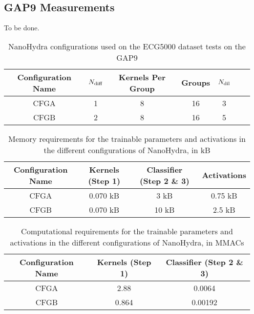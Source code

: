\subsection{GAP9 Measurements}\label{sec:rs_gap9_meas}
To be done.

\begin{table}[h!]
    \centerfloat
    \begin{tabular}{ c c c c c c c }
    \toprule
    \textbf{Configuration Name} & $N\sb{\text{diff}}$ & \textbf{Kernels Per Group} & \textbf{Groups} & $N\sb{\text{dil}}$ \\
    \midrule
    CFGA & 1 & 8 & 16 & 3 \\
    CFGB & 2 & 8 & 16 & 5 \\
    \bottomrule
    \end{tabular}
    \caption{NanoHydra configurations used on the ECG5000 dataset tests on the GAP9}%
    \label{tbl:gap9_test_cfg}
\end{table}

\begin{table}[h!]
    \centerfloat
    \begin{tabular}{ c c c c }
    \toprule
    \textbf{Configuration Name} & Kernels (Step 1) & Classifier (Step 2 \& 3) & Activations \\
    \midrule
    CFGA & 0.070 kB &  3 kB & 0.75 kB \\
    CFGB & 0.070 kB & 10 kB & 2.5  kB \\
    \bottomrule
    \end{tabular}
    \caption{Memory requirements for the trainable parameters and activations in the different configurations of NanoHydra, in kB}%
    \label{tbl:gap9_test_cfg_reqmem}
\end{table}

\begin{table}[h!]
    \centerfloat
    \begin{tabular}{ c c c }
    \toprule
    \textbf{Configuration Name} & Kernels (Step 1) & Classifier (Step 2 \& 3)\\
    \midrule
    CFGA & 2.88  & 0.0064 \\
    CFGB & 0.864 & 0.00192 \\
    \bottomrule
    \end{tabular}
    \caption{Computational requirements for the trainable parameters and activations in the different configurations of NanoHydra, in MMACs}%
    \label{tbl:gap9_test_cfg_reqcomp}
\end{table}

